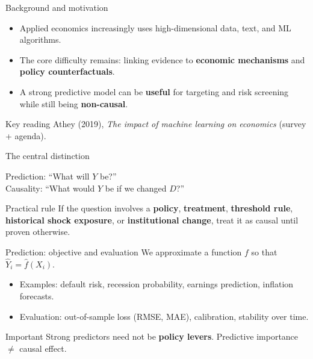 \documentclass[aspectratio=169,11pt]{beamer}
\begin{document}
\begin{frame}{Background and motivation}
  \begin{itemize}
    \item Applied economics increasingly uses high-dimensional data, text, and ML algorithms.
    \item The core difficulty remains: linking evidence to \textbf{economic mechanisms} and \textbf{policy counterfactuals}.
    \item A strong predictive model can be \textbf{useful} for targeting and risk screening while still being \textbf{non-causal}.
  \end{itemize}
  \vspace{0.4em}
  \begin{block}{Key reading}
    Athey (2019), \textit{The impact of machine learning on economics} (survey + agenda).
  \end{block}
\end{frame}

\begin{frame}{The central distinction}
  \begin{center}
    \Large Prediction: ``What will $Y$ be?''\\[0.7em]
    \Large Causality: ``What would $Y$ be if we changed $D$?''
  \end{center}
  \vspace{0.6em}
  \begin{alertblock}{Practical rule}
    If the question involves a \textbf{policy}, \textbf{treatment}, \textbf{threshold rule}, \textbf{historical shock exposure}, or \textbf{institutional change}, treat it as causal until proven otherwise.
  \end{alertblock}
\end{frame}

\begin{frame}{Prediction: objective and evaluation}
  We approximate a function \(f\) so that \(\widehat{Y}_i = \widehat{f}(X_i)\).
  \begin{itemize}
    \item Examples: default risk, recession probability, earnings prediction, inflation forecasts.
    \item Evaluation: out-of-sample loss (RMSE, MAE), calibration, stability over time.
  \end{itemize}
  \vspace{0.3em}
  \begin{block}{Important}
    Strong predictors need not be \textbf{policy levers}. Predictive importance \(\neq\) causal effect.
  \end{block}
\end{frame}
\end{document}
